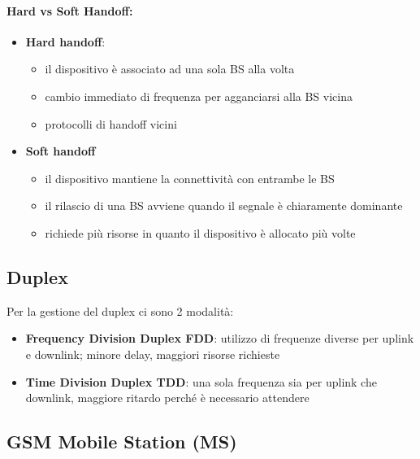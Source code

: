 \paragraph{Hard vs Soft Handoff:}
\begin{itemize}
	\item \textbf{Hard handoff}:
	\begin{itemize}
		\item il dispositivo è associato ad una sola BS alla volta
	
    	\item cambio immediato di frequenza per agganciarsi alla BS vicina
	
    	\item protocolli di handoff vicini
	\end{itemize}
	
	\item \textbf{Soft handoff}
	\begin{itemize}
		\item il dispositivo mantiene la connettività con entrambe le BS
	
    	\item il rilascio di una BS avviene quando il segnale è chiaramente dominante
	
    	\item richiede più risorse in quanto il dispositivo è allocato più volte
	\end{itemize}
\end{itemize}

\subsection{Duplex}

Per la gestione del duplex ci sono 2 modalità:
\begin{itemize}
	\item \textbf{Frequency Division Duplex FDD}: utilizzo di frequenze diverse per uplink e downlink; minore delay, maggiori risorse richieste

	\item \textbf{Time Division Duplex TDD}: una sola frequenza sia per uplink che downlink, maggiore ritardo perché è necessario attendere
\end{itemize}

\subsection{GSM Mobile Station (MS)}

